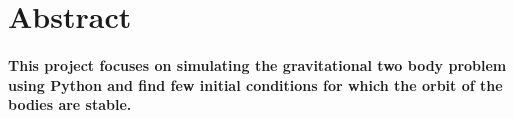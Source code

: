 \section{Abstract}

\paragraph{
This project focuses on simulating the gravitational two body problem using Python and find few initial conditions for which the orbit of the bodies are stable.
}
